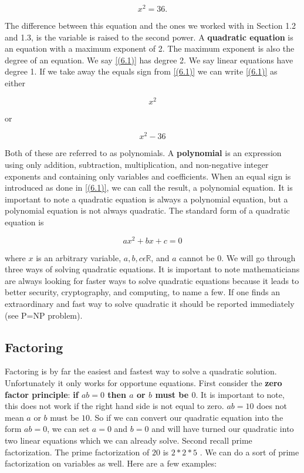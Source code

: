 \documentclass{book}
\theoremstyle{definition}
\begin{document}
\begin{equation}
\label{(6.1)}
x^2=36.
\end{equation}

The difference between this equation and the ones we worked with in Section 1.2 and 1.3, is the variable is raised to the second power. A {\bf quadratic equation} is an equation with a maximum exponent of 2. The maximum exponent is also the degree of an equation. We say \ref{(6.1)} has degree 2. We say linear equations have degree 1.
If we take away the equals sign from \ref{(6.1)} we can write \ref{(6.1)} as either

\begin{equation}
\label{(6.2)}
x^2
\end{equation}

or

\begin{equation}
\label{(6.3)}
x^2-36
\end{equation}

Both of these are referred to as polynomials. A {\bf polynomial} is an expression using only addition, subtraction, multiplication, and non-negative integer exponents and containing only variables and coefficients. When an equal sign is introduced as done in \ref{(6.1)}, we can call the result, a polynomial equation. It is important to note a quadratic equation is always a polynomial equation, but a polynomial equation is not always quadratic.
The standard form of a quadratic equation is

\begin{equation}
\label{(6.4)}
ax^2+bx+c=0
\end{equation}
					
where $x$ is an arbitrary variable, $a,b,c\epsilon \mathbb{R}$, and $a$ cannot be $0$.
We will go through three ways of solving quadratic equations. It is important to note mathematicians are always looking for faster ways to solve quadratic equations because it leads to better security, cryptography, and computing, to name a few. If one finds an extraordinary and fast way to solve quadratic it should be reported immediately (see P=NP problem).

\subsection{Factoring}
Factoring is by far the easiest and fastest way to solve a quadratic solution. Unfortunately it only works for opportune equations.
First consider the {\bf zero factor principle}: {\bf if $ab=0$ then $a$ or $b$ must be $0$}. It is important to note, this does not work if the right hand side is not equal to zero. $ab=10$ does not mean $a$ or $b$ must be $10$.  So if we can convert our quadratic equation into the form $ab=0$, we can set $a=0$ and $b=0$ and will have turned our quadratic into two linear equations which we can already solve.
Second recall prime factorization. The prime factorization of $20$ is $2*2*5$ . We can do a sort of prime factorization on variables as well. Here are a few examples:
\end{document}
